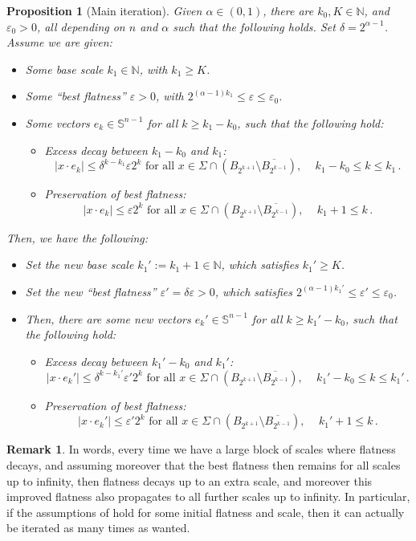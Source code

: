 \documentclass{article}
\newcommand{\N}{\mathbb{N}}
\newcommand{\Sp}{\mathbb{S}}
\newcommand{\ep}{\varepsilon}
\newtheorem{proposition}[theorem]{Proposition}
\theoremstyle{definition}
\newtheorem{remark}[theorem]{Remark}
\begin{document}
\begin{proposition}[Main iteration]\label{prop:mainiteration}
    Given $\alpha\in(0,1)$, there are $k_0,K\in\N$, and $\ep_0>0$, all depending on $n$ and $\alpha$ such that the following holds. Set $\delta=2^{\alpha-1}$. Assume we are given:
    \begin{itemize}
        \item Some base scale $k_1\in\N$, with $k_1\geq K$.
        \item Some ``best flatness'' $\ep>0$, with $2^{(\alpha-1) k_1}\leq \ep\leq \ep_0$.
        \item Some vectors $e_k\in \Sp^{n-1}$ for all $k\geq k_1-k_0$, such that the following hold:
\begin{itemize}
    \item Excess decay between $k_1-k_0$ and $k_1$:
    $$|x\cdot e_{k}|\leq \delta^{k-k_1}\ep 2^{k} \mbox{ for all } x\in\Sigma\cap(B_{2^{k+1}}\setminus \overline{B_{2^{k-1}}}),\,\quad k_1-k_0\leq k \leq k_1\,.$$
    \item Preservation of best flatness: $$|x\cdot e_{k}|\leq \ep 2^{k} \mbox{ for all } x\in\Sigma\cap(B_{2^{k+1}}\setminus \overline{B_{2^{k-1}}}),\,\quad k_1+1\leq k \,.$$
\end{itemize}
    \end{itemize}
Then, we have the following:
    \begin{itemize}
        \item Set the new base scale $k_1':=k_1+1\in\N$, which satisfies $k_1'\geq K$.
        \item Set the new ``best flatness'' $\ep'=\delta\ep>0$, which satisfies $2^{(\alpha-1) k_1'}\leq \ep'\leq \ep_0$.
        \item Then, there are some new vectors $e_k'\in \Sp^{n-1}$ for all $k\geq k_1'-k_0$, such that the following hold:
\begin{itemize}
    \item Excess decay between $k_1'-k_0$ and $k_1'$:
    $$|x\cdot e_{k}'|\leq \delta^{k-k_1'}\ep' 2^{k} \mbox{ for all } x\in\Sigma\cap(B_{2^{k+1}}\setminus \overline{B_{2^{k-1}}}),\,\quad k_1'-k_0\leq k \leq k_1'\,.$$
    \item Preservation of best flatness: $$|x\cdot e_{k}'|\leq \ep' 2^{k} \mbox{ for all } x\in\Sigma\cap(B_{2^{k+1}}\setminus \overline{B_{2^{k-1}}}),\,\quad k_1'+1\leq k \,.$$
\end{itemize}
    \end{itemize}
\end{proposition}
\begin{remark}
    In words, every time we have a large block of scales where flatness decays, and assuming moreover that the best flatness then remains for all scales up to infinity, then flatness decays up to an extra scale, and moreover this improved flatness also propagates to all further scales up to infinity. In particular, if the assumptions of  hold for some initial flatness and scale, then it can actually be iterated as many times as wanted.
\end{remark}
\end{document}
